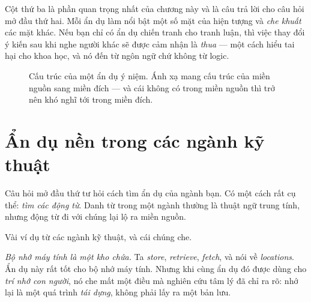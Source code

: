 \documentclass[../../english.tex]{subfiles}
\begin{document}
Cột thứ ba là phần quan trọng nhất của chương này và là câu trả lời cho câu hỏi mở đầu thứ hai. Mỗi ẩn dụ làm nổi bật một số mặt của hiện tượng và \emph{che khuất} các mặt khác. Nếu bạn chỉ có ẩn dụ chiến tranh cho tranh luận, thì việc thay đổi ý kiến sau khi nghe người khác sẽ được cảm nhận là \emph{thua} --- một cách hiểu tai hại cho khoa học, và nó đến từ ngôn ngữ chứ không từ logic.

\begin{figure}[H]\centering
{}
\caption{Cấu trúc của một ẩn dụ ý niệm. Ánh xạ mang cấu trúc của miền nguồn sang miền đích --- và cái không có trong miền nguồn thì trở nên khó nghĩ tới trong miền đích.}
\label{fig:an-du-anh-xa}
\end{figure}

\section{Ẩn dụ nền trong các ngành kỹ thuật}

Câu hỏi mở đầu thứ tư hỏi cách tìm ẩn dụ của ngành bạn. Có một cách rất cụ thể: \emph{tìm các động từ}. Danh từ trong một ngành thường là thuật ngữ trung tính, nhưng động từ đi với chúng lại lộ ra miền nguồn.

Vài ví dụ từ các ngành kỹ thuật, và cái chúng che.

\emph{Bộ nhớ máy tính là một kho chứa.} Ta \emph{store}, \emph{retrieve}, \emph{fetch}, và nói về \emph{locations}. Ẩn dụ này rất tốt cho bộ nhớ máy tính. Nhưng khi cùng ẩn dụ đó được dùng cho \emph{trí nhớ con người}, nó che mất một điều mà nghiên cứu tâm lý đã chỉ ra rõ\cite{roediger2006}: nhớ lại là một quá trình \emph{tái dựng}, không phải lấy ra một bản lưu.
\end{document}

